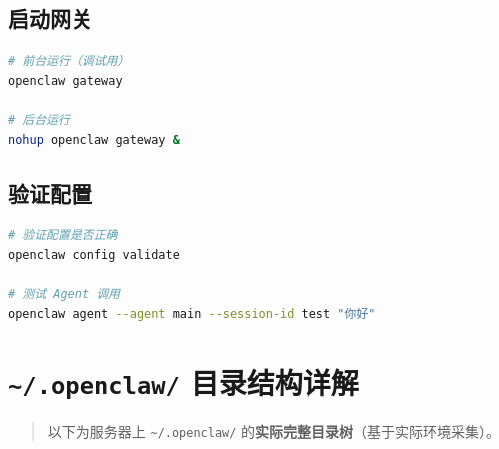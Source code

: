 \subsection{启动网关}


\begin{lstlisting}[language=bash]
# 前台运行（调试用）
openclaw gateway

# 后台运行
nohup openclaw gateway &
\end{lstlisting}

\subsection{验证配置}


\begin{lstlisting}[language=bash]
# 验证配置是否正确
openclaw config validate

# 测试 Agent 调用
openclaw agent --agent main --session-id test "你好"
\end{lstlisting}

\hrulefill

\section{\texttt{\textasciitilde{}/.openclaw/} 目录结构详解}


\begin{quote}
以下为服务器上 \texttt{\textasciitilde{}/.openclaw/} 的\textbf{实际完整目录树}（基于实际环境采集）。
\end{quote}


